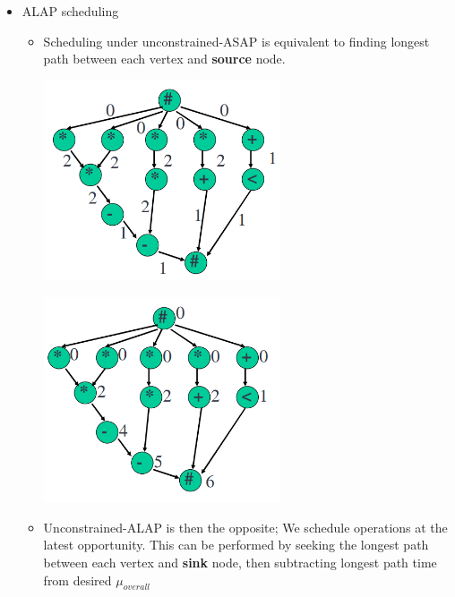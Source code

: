 \documentclass{article}
\begin{document}
\begin{itemize}
    \item ALAP scheduling
        \begin{itemize}
            \item Scheduling under unconstrained-ASAP is equivalent to finding longest path between each vertex and \textbf{source} node.
                \begin{minipage}{0.5\linewidth}
                    \includegraphics[width=7cm]{S2/alap1.PNG}
                    \captionsetup{justification=centering}
                \end{minipage}%
                \hfill
                \begin{minipage}{0.5\linewidth}
                    \includegraphics[width=7cm]{S2/alap2}
                    \captionsetup{justification=centering}
                \end{minipage}%
            \vspace{2cm}
            \item Unconstrained-ALAP is then the opposite; We schedule operations at the latest opportunity.
                    This can be performed by seeking the longest path between each vertex and \textbf{sink} node, then subtracting longest path time from desired $\mu_{overall}$


\end{itemize}
\end{itemize}
\end{document}
